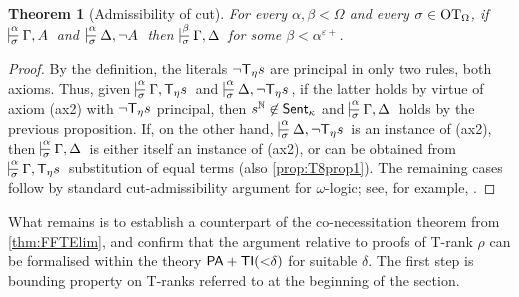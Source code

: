 \documentclass[UKenglish,cleveref,DIV=12]{scrartcl}
\newtheorem{theorem}{Theorem}
\theoremstyle{definition}
\theoremstyle{definition}
\begin{document}
\begin{theorem}[Admissibility of cut]\label{thm:T8CutElim}%
For every $\alpha,\beta<\Omega$ and every $\sigma\in\mathrm{OT}_\Omega$, if\/ $\prov{\alpha}{\sigma} {\Gamma,A}$ and\, $\prov{\alpha}{\sigma} {\Delta,\lnot A}$ then $\prov{\beta}\sigma{\Gamma,\Delta}$ for some $\beta<\alpha^{\varepsilon+}$.
\end{theorem}
\begin{proof}
By the definition, the literals \( \lnot \mathsf{T}_\eta s \) are principal in only two rules, both axioms.
Thus, given $\prov{\alpha}{\sigma}{\Gamma ,\T_\eta s}$ and $\prov{\alpha}{\sigma}{\Delta,\lnot \T_\eta s}$, if the latter holds by virtue of axiom (ax2) with $\lnot \mathsf{T}_\eta s$ principal, then \( s^\mathbb N \not\in \mathsf{Sent}_\kappa \) and \( \prov \alpha \sigma {\Gamma , \Delta} \) holds by the previous proposition.
If, on the other hand, $\prov{\alpha}{\sigma}{\Delta,\lnot \T_\eta s}$ is an instance of (ax2), then \( \prov \alpha \sigma {\Gamma , \Delta} \) is either itself an instance of (ax2), or can be obtained from \( \prov \alpha \sigma {\Gamma , \T_\eta s} \) substitution of equal terms (also \cref{prop:T8prop1}).
%
The remaining cases follow by standard cut-admissibility argument for \( \omega \)-logic; see, for example, \cite{LeiRat10}.
\end{proof}

What remains is to establish a counterpart of the co-necessitation theorem from
\cref{thm:FFTElim}, and confirm that the argument relative to proofs of T-rank \( \rho \) can be formalised
within the theory $\mathsf{PA}+\mathsf{TI}({<}\delta)$ for suitable $\delta$. 
The first step is bounding property on T-ranks referred to at the beginning of the section.
\end{document}

